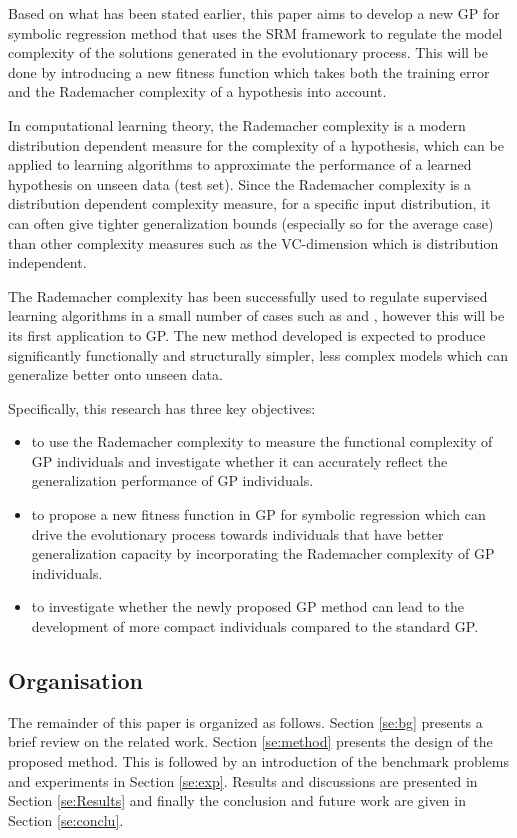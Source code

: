\documentclass[conference]{IEEEtran}
\begin{document}
Based on what has been stated earlier, this paper aims to develop a new GP for symbolic regression method that uses the SRM framework to regulate the model complexity of the solutions generated in the evolutionary process. This will be done by introducing a new fitness function  which takes both the training error and the Rademacher complexity of a hypothesis into account. 

In computational learning theory, the Rademacher complexity \cite{b26} \cite{b27} is a modern distribution dependent measure for the complexity of a hypothesis, which can be applied to learning algorithms to approximate the performance of a learned hypothesis on unseen data (test set). Since the Rademacher complexity is a distribution dependent complexity measure, for a specific input distribution, it can often give tighter generalization bounds (especially so for the average case)  than other complexity measures such as the VC-dimension which is distribution independent.

The Rademacher complexity has been successfully used to regulate supervised learning algorithms in a small number of cases such as \cite{b11} and \cite{b12}, however this will be its first application to GP. The new method developed is expected to produce significantly functionally and structurally simpler, less complex models which can generalize better onto unseen data. 

\bigbreak
Specifically, this research has three key objectives:

\begin{itemize}

  \item to use the Rademacher complexity to measure the functional complexity of GP individuals and investigate whether it can accurately reflect the generalization performance of GP individuals.
  
  \item to propose a new fitness function in GP for symbolic regression which can drive the evolutionary process towards individuals that have better generalization capacity by incorporating the Rademacher complexity of GP individuals.
  
  \item to investigate whether the newly proposed GP method can lead to the development of more compact individuals compared to the standard GP.

\end{itemize}

\subsection{Organisation}
The remainder of this paper is organized as follows. Section \ref{se:bg} presents a brief review on the related work. Section \ref{se:method} presents the design of the proposed method. This is followed by an introduction of the benchmark problems and experiments in Section \ref{se:exp}. Results and discussions are presented in Section \ref{se:Results} and finally the conclusion and future work are given in Section \ref{se:conclu}.
\end{document}
